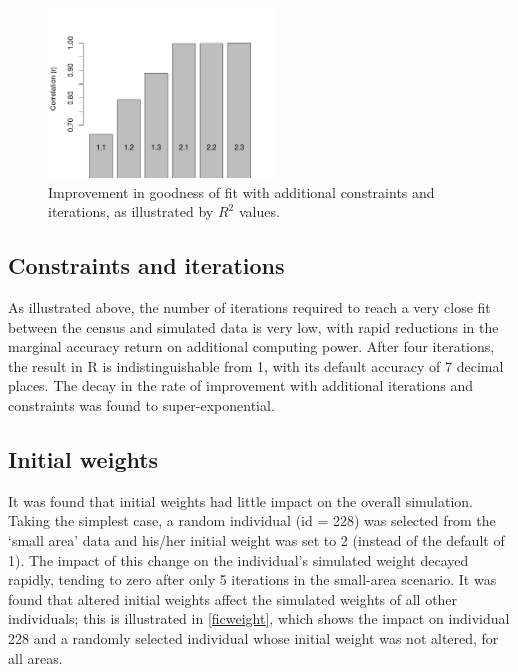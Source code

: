 \documentclass[a4paper,10pt]{article}
\begin{document}
\begin{figure}[h]
 \begin{center}
  \includegraphics[width=6cm]{corr-baseline}
 \end{center}
\caption{Improvement in goodness of fit with additional constraints and iterations, 
as illustrated by $R^2$ values.}
\label{fnconscor}
\end{figure}

\subsection{Constraints and iterations}
As illustrated above, the number of iterations 
required to reach a very close fit between the census
 and simulated data is very low, with rapid reductions in
 the marginal accuracy return on additional computing power.
 After four iterations, the result in R is indistinguishable from 1,
 with its default accuracy of 7 decimal places. 
The decay in the rate of improvement with additional 
iterations and constraints was found to super-exponential. 

\subsection{Initial weights}
It was found that initial weights had little impact on the overall simulation. 
Taking the simplest case, a random individual (id = 228) was selected from the 
`small area' data and his/her initial weight was set to 2 
(instead of the default of 1). The impact of this change on the individual's 
simulated weight decayed rapidly, tending to zero after only 5 iterations in the small-area scenario. 
It was found that altered initial weights affect the simulated weights of all other individuals; 
this is illustrated in \cref{ficweight}, which shows the impact on individual 228 and a randomly selected 
individual whose initial weight was not altered, for all areas.
\end{document}
